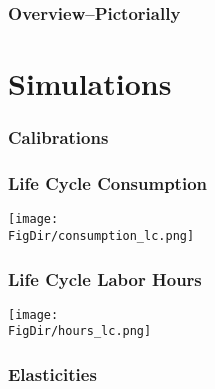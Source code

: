 \documentclass[pdflatex]{beamer}
\providecommand{\texnameMaster}{ProjectMMD}%
\providecommand{\TableDir}{\econtexRoot/Tables}
\begin{document}
\begin{frame}
  \frametitle{Overview--Pictorially}
  

  \end{frame}

\section{Simulations}

\begin{frame}
  \frametitle{Calibrations}
  
  \end{frame}

  \begin{frame}
    \frametitle{Life Cycle Consumption}
    \begin{center}
\texttt{[image: \\FigDir/consumption\_lc.png]}
\end{center}
\end{frame}

    \begin{frame}
      \frametitle{Life Cycle Labor Hours}
      \begin{center}
      \texttt{[image: \\FigDir/hours\_lc.png]}
\end{center}
    \end{frame}

    \begin{frame}
      \frametitle{Elasticities}
      
      \end{frame}

\begin{frame}

\renewcommand{\bibsection}{\subsubsection*{\bibname }}

\tiny 



\end{frame}
\end{document}
